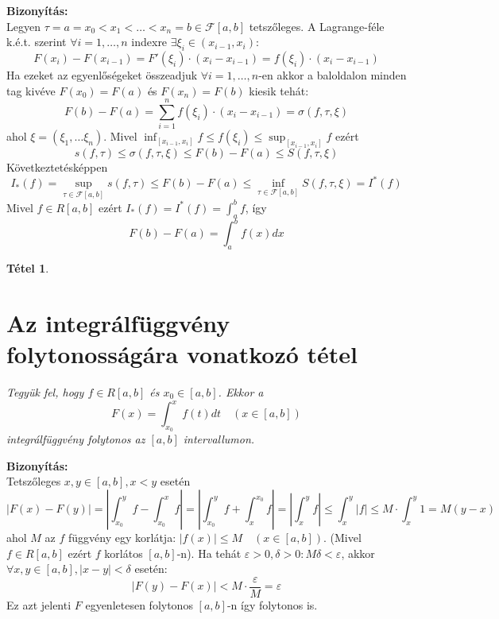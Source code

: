 \documentclass{article}
\newtheorem{theorem}{Tétel}
\renewenvironment{proof}{\textbf{Bizonyítás:} \\}{\hfill}
\begin{document}
\begin{proof}
Legyen $\tau={a=x_0<x_1<\dots<x_n=b}\in\mathcal{F}[a,b]$ tetszőleges. A Lagrange-féle k.é.t. szerint $\forall i=1,\dots,n$ indexre $\exists\xi_i\in (x_{i-1},x_i)$:
\begin{equation*}
    F(x_i)-F(x_{i-1})=F'(\xi_i)\cdot(x_i-x_{i-1})=f(\xi_i)\cdot(x_i-x_{i-1})
\end{equation*}
Ha ezeket az egyenlőségeket összeadjuk $\forall i=1,\dots,n$-en akkor a baloldalon minden tag kivéve $F(x_0)=F(a)$ és $F(x_n)=F(b)$ kiesik tehát:
\begin{equation*}
    F(b) - F(a)=\sum_{i=1}^n f(\xi_i)\cdot (x_i-x_{i-1})=\sigma(f,\tau,\xi)
\end{equation*}
ahol $\xi=(\xi_1,\dots\xi_n)$. Mivel $\displaystyle\inf_{[x_{i-1},x_i]}f\leq f(\xi_i)\leq \displaystyle\sup_{[x_{i-1},x_i]}f$ ezért 
\begin{equation*}
    s(f,\tau)\leq \sigma(f,\tau,\xi)\leq F(b)-F(a) \leq S(f,\tau, \xi)
\end{equation*}
Következtetésképpen
\begin{equation*}
    I_*(f)=\sup_{\tau\in\mathcal{F}[a,b]}s(f,\tau)\leq F(b)-F(a) \leq \inf_{\tau\in\mathcal{F}[a,b]} S(f,\tau,\xi)=I^*(f)
\end{equation*}
Mivel $f\in R[a,b]$ ezért $I_*(f)=I^*(f)=\int_a^b f$, így
\begin{equation*}
    F(b)-F(a)=\int_a^b f(x)dx
\end{equation*}
\end{proof}
\newpage
\begin{theorem}
\section{Az integrálfüggvény folytonosságára vonatkozó tétel} 
Tegyük fel, hogy $f\in R[a,b]$ és $x_0 \in [a,b]$. Ekkor a
\begin{equation*}
    F(x)=\int_{x_0}^xf(t)dt\quad (x\in [a,b])
\end{equation*}
integrálfüggvény folytonos az $[a,b]$ intervallumon.
\end{theorem}
\begin{proof}
Tetszőleges $x,y\in [a,b], x < y$ esetén
\begin{equation*}
    |F(x)-F(y)| = \left|\int_{x_0}^yf-\int_{x_0}^xf\right| = \left|\int_{x_0}^yf+\int_x^{x_0}f\right|=\left|\int_x^yf\right|\leq \int_x^y|f|\leq M\cdot\int_x^y1=M(y-x)
\end{equation*}
ahol $M$ az $f$ függvény egy korlátja: $|f(x)|\leq M\quad (x\in[a,b])$. (Mivel $f\in R[a,b]$ ezért $f$ korlátos $[a,b]$-n). Ha tehát $\varepsilon > 0, \delta > 0: M\delta < \varepsilon$, akkor $\forall x,y \in [a,b], |x-y| < \delta$ esetén:
\begin{equation*}
    |F(y)-F(x)| < M\cdot\frac{\varepsilon}{M}=\varepsilon
\end{equation*}
Ez azt jelenti $F$ egyenletesen folytonos $[a,b]$-n így folytonos is.
\end{proof}
\end{document}
